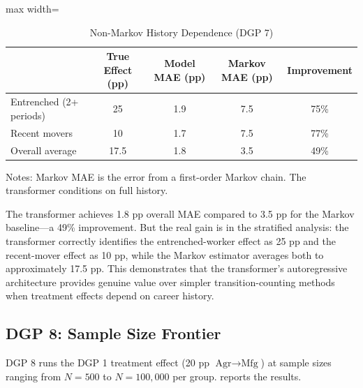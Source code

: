 \documentclass[12pt]{article}
\begin{document}
\begin{table}[H]
\centering
\caption{Non-Markov History Dependence (DGP 7)}
\label{tab:dgp7}
\footnotesize
\begin{threeparttable}
\begin{adjustbox}{max width=\textwidth}
\begin{tabular}{lcccc}
\toprule
& True Effect (pp) & Model MAE (pp) & Markov MAE (pp) & Improvement \\
\midrule
Entrenched (2+ periods) & 25 & 1.9 & 7.5 & 75\% \\
Recent movers & 10 & 1.7 & 7.5 & 77\% \\
Overall average & 17.5 & 1.8 & 3.5 & 49\% \\
\bottomrule
\end{tabular}
\end{adjustbox}
\begin{tablenotes}[flushleft]
\small
\item Notes: Markov MAE is the error from a first-order Markov chain. The transformer conditions on full history.
\end{tablenotes}
\end{threeparttable}
\end{table}

The transformer achieves 1.8 pp overall MAE compared to 3.5 pp for the Markov baseline---a 49\% improvement. But the real gain is in the stratified analysis: the transformer correctly identifies the entrenched-worker effect as 25 pp and the recent-mover effect as 10 pp, while the Markov estimator averages both to approximately 17.5 pp. This demonstrates that the transformer's autoregressive architecture provides genuine value over simpler transition-counting methods when treatment effects depend on career history.

\subsection{DGP 8: Sample Size Frontier}

DGP 8 runs the DGP 1 treatment effect (20 pp $\text{Agr} \to \text{Mfg}$) at sample sizes ranging from $N = 500$ to $N = 100,000$ per group.  reports the results.
\end{document}
